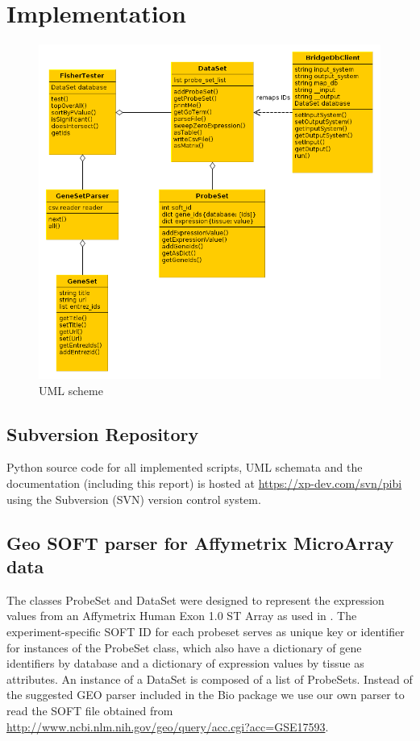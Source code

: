 \section{Implementation}

\begin{figure}[htbp]
 \centering
 \includegraphics[scale=0.5]{../pibi_uml.png}
 \caption{UML scheme}
 \label{fig:uml}
\end{figure}


  \subsection[SVN Repository]{Subversion Repository}
  Python source code for all implemented scripts, UML schemata and the
documentation (including this report) is hosted at
\url{https://xp-dev.com/svn/pibi} using the Subversion (SVN) version control
system.
  
  \subsection[Geo SOFT parser]{Geo SOFT parser for Affymetrix MicroArray data}
  
  The classes ProbeSet and DataSet were designed to represent the expression
values from an Affymetrix Human Exon 1.0 ST Array as used in \cite{Berger2010}.
The experiment-specific SOFT ID for each probeset serves as unique key or
identifier for instances of the ProbeSet class, which also have a dictionary of
gene identifiers by database and a dictionary of expression values by tissue as
attributes. An instance of a DataSet is composed of a list of ProbeSets. Instead
of the suggested GEO parser included in the Bio package we use our own parser to
read the SOFT file obtained from
\url{http://www.ncbi.nlm.nih.gov/geo/query/acc.cgi?acc=GSE17593}.
  
